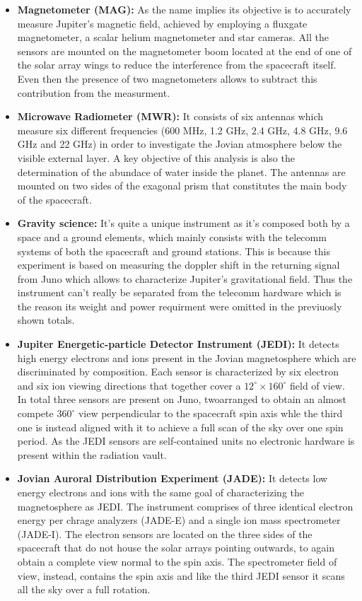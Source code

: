 \begin{itemize}
    \item \textbf{Magnetometer (MAG):} As the name implies its objective is to accurately measure Jupiter's magnetic field, achieved by employing a fluxgate magnetometer, a scalar helium magnetometer and star cameras. All the sensors are mounted on the magnetometer boom located at the end of one of the solar array wings to reduce the interference from the spacecraft itself. Even then the presence of two magnetometers allows to subtract this contribution from the measurment.
    
    \item \textbf{Microwave Radiometer (MWR):} It consists of six antennas which measure six different frequencies (600 MHz, 1.2 GHz, 2.4 GHz, 4.8 GHz, 9.6 GHz and 22 GHz) in order to investigate the Jovian atmosphere below the visible external layer. A key objective of this analysis is also the determination of the abundace of water inside the planet. The antennas are mounted on two sides of the exagonal prism that constitutes the main body of the spacecraft.
    
    \item \textbf{Gravity science:} It's quite a unique instrument as it's composed both by a space and a ground elements, which mainly consists with the telecomm systems of both the spacecraft and ground stations. This is because this experiment is based on measuring the doppler shift in the returning signal from Juno which allows to characterize Jupiter's gravitational field. Thus the instrument can't really be separated from the telecomm hardware which is the reason its weight and power requirment were omitted in the previuosly shown totals.
    
    \item \textbf{Jupiter Energetic-particle Detector Instrument (JEDI):} It detects high energy electrons and ions present in the Jovian magnetosphere which are discriminated by composition. Each sensor is characterized by six electron and six ion viewing directions that together cover a $12^{\circ} \times 160^{\circ}$ field of view. In total three sensors are present on Juno, twoarranged to obtain an almost compete $360^{\circ}$ view perpendicular to the spacecraft spin axis whle the third one is instead aligned with it to achieve a full scan of the sky over one spin period. As the JEDI sensors are self-contained units no electronic hardware is present within the radiation vault.

    \item \textbf{Jovian Auroral Distribution Experiment (JADE):} It detects low energy electrons and ions with the same goal of characterizing the magnetosphere as JEDI. The instrument comprises of three identical electron energy per chrage analyzers (JADE-E) and a single ion mass spectrometer (JADE-I). The electron sensors are located on the three sides of the  spacecraft that do not house the solar arrays pointing outwards, to again obtain a complete view normal to the spin axis. The spectrometer field of view, instead, contains the spin axis and like the third JEDI sensor it scans all the sky over a full rotation.
    

\end{itemize}
